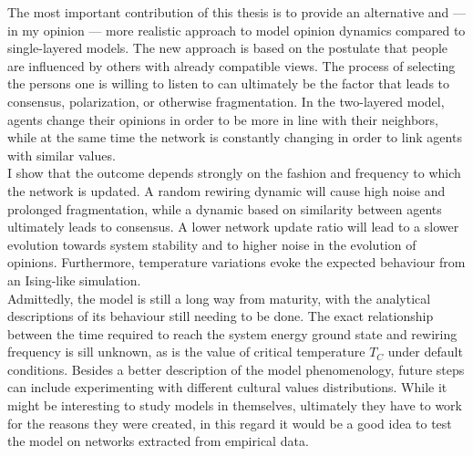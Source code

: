 \documentclass[12pt,openright,twoside]{book}
\renewcommand{\contentsname}{{\Huge Table of Contents}}
\begin{document}
The most important contribution of this thesis is to provide an alternative and --- in my opinion --- more realistic approach to model opinion dynamics compared to single-layered models. The new approach is based on the postulate that people are influenced by others with already compatible views. The process of selecting the persons one is willing to listen to can ultimately be the factor that leads to consensus, polarization, or otherwise fragmentation. In the two-layered model, agents change their opinions in order to be more in line with their neighbors, while at the same time the network is constantly changing in order to link agents with similar values.\\

I show that the outcome depends strongly on the fashion and frequency to which the network is updated. A random rewiring dynamic will cause high noise and prolonged fragmentation, while a dynamic based on similarity between agents ultimately leads to consensus. A lower network update ratio will lead to a slower evolution towards system stability and to higher noise in the evolution of opinions. Furthermore, temperature variations evoke the expected behaviour from an Ising-like simulation.\\

Admittedly, the model is still a long way from maturity, with the analytical descriptions of its behaviour still needing to be done. The exact relationship between the time required to reach the system energy ground state and rewiring frequency is sill unknown, as is the value of critical temperature $T_C$ under default conditions. Besides a better description of the model phenomenology, future steps can include experimenting with different cultural values distributions. While it might be interesting to study models in themselves, ultimately they have to work for the reasons they were created, in this regard it would be a good idea to test the model on networks extracted from empirical data.\\







\renewcommand{\contentsname}{References}
\renewcommand\bibname{References} %

%
%


\end{document}

